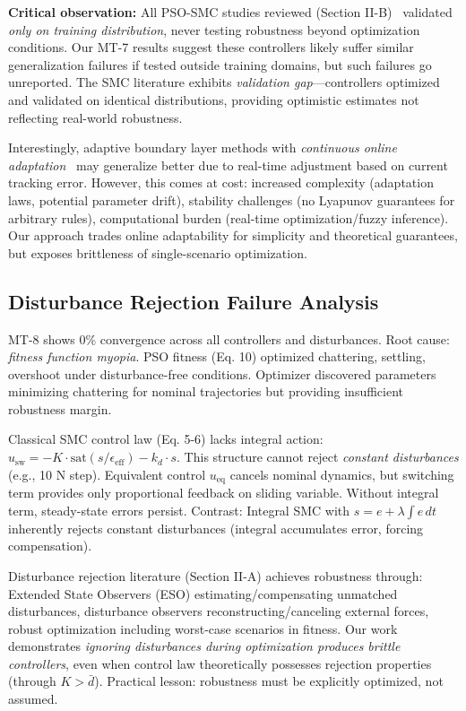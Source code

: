 \documentclass[conference]{IEEEtran}
\begin{document}
\textbf{Critical observation:} All PSO-SMC studies reviewed (Section II-B)~\cite{ayinalem2025pso,hepso2025manipulator,mdpi2025quadcopter} validated \emph{only on training distribution}, never testing robustness beyond optimization conditions. Our MT-7 results suggest these controllers likely suffer similar generalization failures if tested outside training domains, but such failures go unreported. The SMC literature exhibits \emph{validation gap}—controllers optimized and validated on identical distributions, providing optimistic estimates not reflecting real-world robustness.

Interestingly, adaptive boundary layer methods with \emph{continuous online adaptation}~\cite{ieee2018selfreg,frontiers2024fuzzy} may generalize better due to real-time adjustment based on current tracking error. However, this comes at cost: increased complexity (adaptation laws, potential parameter drift), stability challenges (no Lyapunov guarantees for arbitrary rules), computational burden (real-time optimization/fuzzy inference). Our approach trades online adaptability for simplicity and theoretical guarantees, but exposes brittleness of single-scenario optimization.

\subsection{Disturbance Rejection Failure Analysis}

MT-8 shows 0\% convergence across all controllers and disturbances. Root cause: \emph{fitness function myopia}. PSO fitness (Eq. 10) optimized chattering, settling, overshoot under disturbance-free conditions. Optimizer discovered parameters minimizing chattering for nominal trajectories but providing insufficient robustness margin.

Classical SMC control law (Eq. 5-6) lacks integral action: $u_{\text{sw}} = -K \cdot \text{sat}(s/\epsilon_{\text{eff}}) - k_d \cdot s$. This structure cannot reject \emph{constant disturbances} (e.g., 10 N step). Equivalent control $u_{\text{eq}}$ cancels nominal dynamics, but switching term provides only proportional feedback on sliding variable. Without integral term, steady-state errors persist. Contrast: Integral SMC with $s = e + \lambda \int e \, dt$ inherently rejects constant disturbances (integral accumulates error, forcing compensation).

Disturbance rejection literature (Section II-A) achieves robustness through: Extended State Observers (ESO) estimating/compensating unmatched disturbances, disturbance observers reconstructing/canceling external forces, robust optimization including worst-case scenarios in fitness. Our work demonstrates \emph{ignoring disturbances during optimization produces brittle controllers}, even when control law theoretically possesses rejection properties (through $K > \bar{d}$). Practical lesson: robustness must be explicitly optimized, not assumed.
\end{document}
